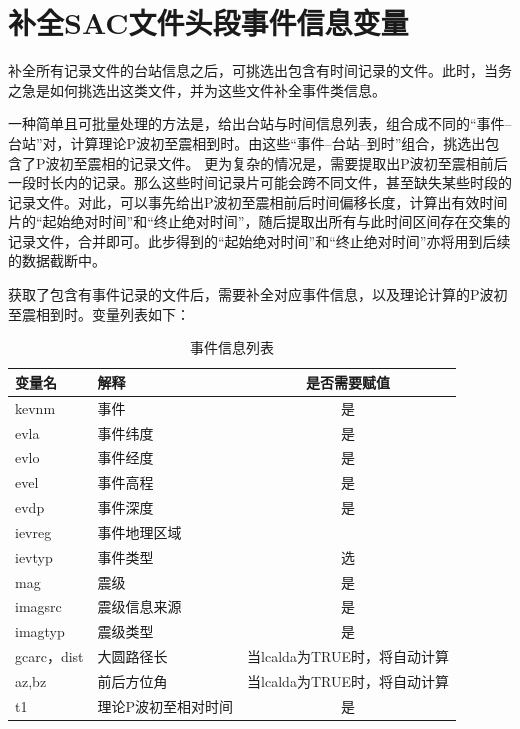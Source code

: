 \documentclass[a4paper]{article}
\begin{document}
\clearpage\section{补全SAC文件头段事件信息变量}
补全所有记录文件的台站信息之后，可挑选出包含有时间记录的文件。此时，当务之急是如何挑选出这类文件，并为这些文件补全事件类信息。\par
一种简单且可批量处理的方法是，给出台站与时间信息列表，组合成不同的“事件--台站”对，计算理论P波初至震相到时。由这些“事件--台站--到时”组合，挑选出包含了P波初至震相的记录文件。
更为复杂的情况是，需要提取出P波初至震相前后一段时长内的记录。那么这些时间记录片可能会跨不同文件，甚至缺失某些时段的记录文件。对此，可以事先给出P波初至震相前后时间偏移长度，计算出有效时间片的“起始绝对时间”和“终止绝对时间”，随后提取出所有与此时间区间存在交集的记录文件，合并即可。此步得到的“起始绝对时间”和“终止绝对时间”亦将用到后续的数据截断中。\par
获取了包含有事件记录的文件后，需要补全对应事件信息，以及理论计算的P波初至震相到时。变量列表如下：
\begin{table}[!htbp]
	\centering
	\caption{事件信息列表}\label{tab::EvInfoTab}
	\begin{tabular}{llc}
	\toprule
	变量名		&解释				&是否需要赋值\\\midrule
	kevnm   	&事件				&是\\\midrule
	evla		&事件纬度			&是\\
	evlo		&事件经度			&是\\
	evel		&事件高程			&是\\
	evdp		&事件深度			&是\\
	ievreg		&事件地理区域	\\\midrule
	ievtyp		&事件类型			&选\\\midrule
	mag			&震级				&是\\
	imagsrc		&震级信息来源			&是\\
	imagtyp		&震级类型			&是\\\midrule
	gcarc，dist	&大圆路径长			&当lcalda为TRUE时，将自动计算\\		
	az,bz		&前后方位角			&当lcalda为TRUE时，将自动计算\\\midrule
	t1			&理论P波初至相对时间	&是\\
	\bottomrule
	\end{tabular}
\end{table}
\end{document}
